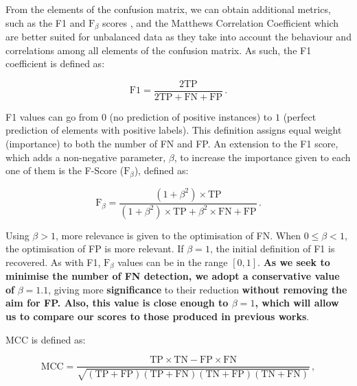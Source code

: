 \documentclass{aa}
\begin{document}
From the elements of the confusion matrix, we can obtain additional metrics, such as the F1 and $\mathrm{F}_{\beta}$ scores \citep{10.2307/1932409, sorenson1948method, van1979information}, and the Matthews Correlation Coefficient \citep[MCC;][]{10.2307/2340126, nla.cat-vn81100, MATTHEWS1975442} which are better suited for unbalanced data as they take into account the behaviour and correlations among all elements of the confusion matrix.
As such, the F1 coefficient is defined as: 

\begin{equation}\label{eq:f1}
\mathrm{F1} = \frac{2 \mathrm{TP}}{2 \mathrm{TP} + \mathrm{FN} + \mathrm{FP}}\,.
\end{equation}

\noindent 
F1 values can go from $0$ (no prediction of positive instances) to $1$ (perfect prediction of elements with positive labels). This definition assigns equal weight (importance) to both the number of FN and FP. An extension to the F1 score, which adds a non-negative parameter, $\beta$, to increase the importance given to each one of them is the F-Score ($\mathrm{F}_{\beta}$), defined as:

\begin{equation}\label{eq:f_beta}
\mathrm{F}_{\beta} = \frac{(1 + \beta^{2}) \times \mathrm{TP}}{(1 + \beta^{2}) \times \mathrm{TP} + \beta^{2} \times \mathrm{FN} + \mathrm{FP}}\,.
\end{equation}

Using ${\beta > 1}$, more relevance is given to the optimisation of FN. When ${0 \leq \beta < 1}$, the optimisation of FP is more relevant. If $\beta = 1$, the initial definition of F1 is recovered. As with F1, $\mathrm{F}_{\beta}$ values can be in the range ${[0, 1]}$. \textbf{As we seek to minimise the number of FN detection, we adopt a conservative value of} ${\beta = 1.1}$, giving more \textbf{significance} to their reduction \textbf{without removing the aim for FP. Also, this value is close enough to $\beta = 1$, which will allow us to compare our scores to those produced in previous works}.

MCC is defined as:

\begin{equation}\label{eq:mcc}
\mathrm{MCC} = \frac{\mathrm{TP} \times \mathrm{TN} - \mathrm{FP} \times \mathrm{FN}}{\sqrt{(\mathrm{TP} + \mathrm{FP}) (\mathrm{TP} + \mathrm{FN}) (\mathrm{TN} + \mathrm{FP}) (\mathrm{TN} + \mathrm{FN})}}\,,
\end{equation}
\end{document}
